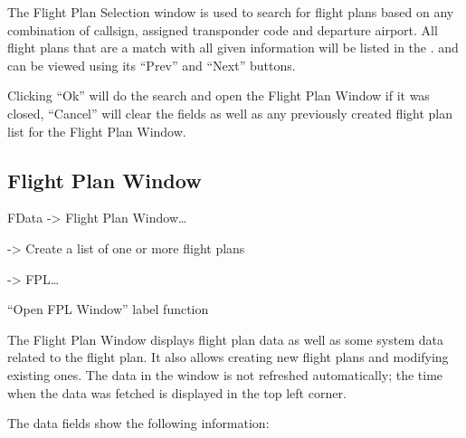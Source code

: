 \documentclass[a4paper,oneside,11pt]{memoir}
\begin{document}
The Flight Plan Selection window is used to search for flight plans based on any combination of callsign, assigned transponder code and departure airport. All flight plans that are a match with all given information will be listed in the . and can be viewed using its “Prev” and “Next” buttons.

\bigskip

Clicking “Ok” will do the search and open the Flight Plan Window if it was closed, “Cancel” will clear the fields as well as any previously created flight plan list for the Flight Plan Window.

\subsection{Flight Plan Window}
\label{win:fpw}

 FData -> Flight Plan Window… 

 -> Create a list of one or more flight plans 

 -> FPL… 

“Open FPL Window” label function

\bigskip


The Flight Plan Window displays flight plan data as well as some system data related to the flight plan. It also allows creating new flight plans and modifying existing ones. The data in the window is not refreshed automatically; the time when the data was fetched is displayed in the top left corner.

\bigskip

The data fields show the following information:
\end{document}
